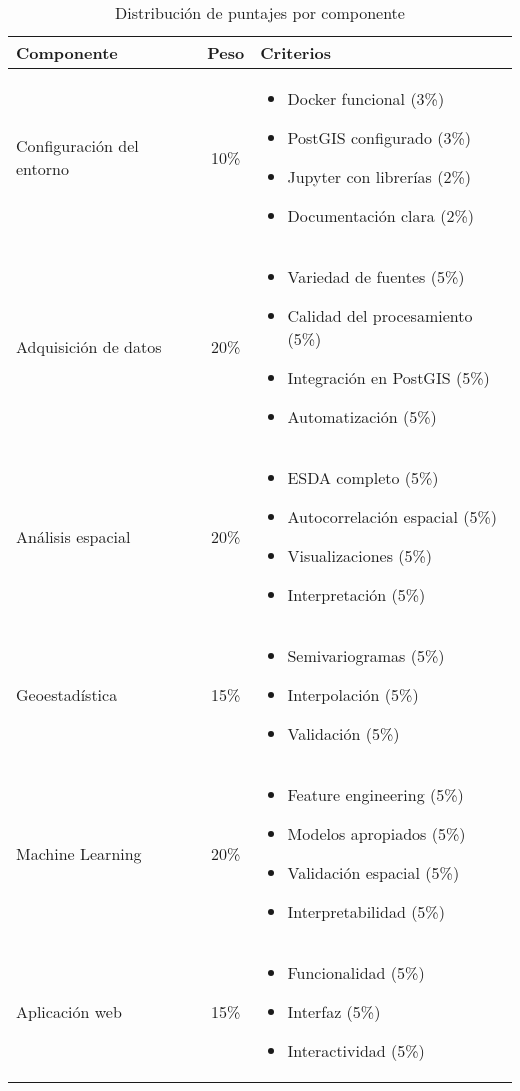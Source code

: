 \documentclass[12pt,a4paper]{article}
\begin{document}
\begin{table}[H]
\centering
\begin{tabular}{lcp{7cm}}
\toprule
\textbf{Componente} & \textbf{Peso} & \textbf{Criterios} \\
\midrule
Configuración del entorno & 10\% &
\begin{itemize}
    \item Docker funcional (3\%)
    \item PostGIS configurado (3\%)
    \item Jupyter con librerías (2\%)
    \item Documentación clara (2\%)
\end{itemize} \\
\midrule
Adquisición de datos & 20\% &
\begin{itemize}
    \item Variedad de fuentes (5\%)
    \item Calidad del procesamiento (5\%)
    \item Integración en PostGIS (5\%)
    \item Automatización (5\%)
\end{itemize} \\
\midrule
Análisis espacial & 20\% &
\begin{itemize}
    \item ESDA completo (5\%)
    \item Autocorrelación espacial (5\%)
    \item Visualizaciones (5\%)
    \item Interpretación (5\%)
\end{itemize} \\
\midrule
Geoestadística & 15\% &
\begin{itemize}
    \item Semivariogramas (5\%)
    \item Interpolación (5\%)
    \item Validación (5\%)
\end{itemize} \\
\midrule
Machine Learning & 20\% &
\begin{itemize}
    \item Feature engineering (5\%)
    \item Modelos apropiados (5\%)
    \item Validación espacial (5\%)
    \item Interpretabilidad (5\%)
\end{itemize} \\
\midrule
Aplicación web & 15\% &
\begin{itemize}
    \item Funcionalidad (5\%)
    \item Interfaz (5\%)
    \item Interactividad (5\%)
\end{itemize} \\
\bottomrule
\end{tabular}
\caption{Distribución de puntajes por componente}
\end{table}
\end{document}
